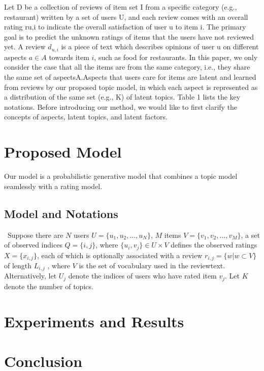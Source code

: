 \documentclass[10pt,conference]{IEEEtran}
\begin{document}
Let D be a collection of reviews of item set I from a specific category (e.g., restaurant) written by a set of users U, and each review comes with an overall rating ru,i to indicate the overall satisfaction of user u to item i. The primary goal is to predict the unknown ratings of items that the users have not reviewed yet. A review $d_{u,i}$ is a piece of text which describes opinions of user u on different aspects $a \in A$ towards item $i$, such as food for restaurants. In this paper, we only consider the case that all the items are from the same category, i.e., they share the same set of aspectsA.Aspects that users care for items are latent and learned from reviews by our proposed topic model, in which each aspect is represented as a distribution of the same set (e.g., K) of latent topics. Table 1 lists the key notations. Before introducing our method, we would like to first clarify the concepts of aspects, latent topics, and latent factors.

\section{Proposed Model}
Our model is a probabilistic generative model that combines a topic model seamlessly with a rating model. 

\subsection{Model and Notations}\
Suppose there are $N$ users $U = \{u_1,u_2, \dots ,u_N\}$, $M$ items
$V = \{v_1, v_2, \dots , v_M\}$, a set of observed indices $Q = \{i, j\}$, where $\{u_i, v_j\} \in U \times V$ defines the observed ratings $X = \{x_{i,j}\}$, each of which is optionally associated with a review $r_{i,j} = \{w|w \subset V\}$ of length $L_{i,j}$ , where $V$ is the set of vocabulary used in the reviewtext. Alternatively, let $U_j$ denote the indices of users who have rated item $v_j$. Let $K$ denote the number of topics.



\section{Experiments and Results}

\section{Conclusion}

\newpage



\end{document}
